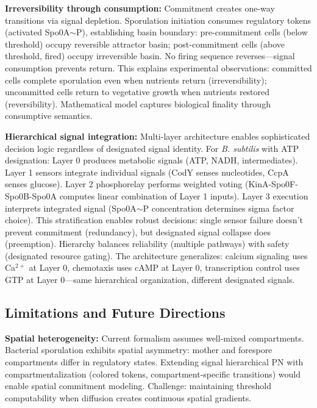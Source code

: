 \documentclass[10pt,letterpaper]{article}
\begin{document}
\textbf{Irreversibility through consumption:} Commitment creates one-way transitions via signal depletion. Sporulation initiation consumes regulatory tokens (activated Spo0A$\sim$P), establishing basin boundary: pre-commitment cells (below threshold) occupy reversible attractor basin; post-commitment cells (above threshold, fired) occupy irreversible basin. No firing sequence reverses---signal consumption prevents return. This explains experimental observations: committed cells complete sporulation even when nutrients return (irreversibility); uncommitted cells return to vegetative growth when nutrients restored (reversibility). Mathematical model captures biological finality through consumptive semantics.

\textbf{Hierarchical signal integration:} Multi-layer architecture enables sophisticated decision logic regardless of designated signal identity. For \textit{B. subtilis} with ATP designation: Layer 0 produces metabolic signals (ATP, NADH, intermediates). Layer 1 sensors integrate individual signals (CodY senses nucleotides, CcpA senses glucose). Layer 2 phosphorelay performs weighted voting (KinA-Spo0F-Spo0B-Spo0A computes linear combination of Layer 1 inputs). Layer 3 execution interprets integrated signal (Spo0A$\sim$P concentration determines sigma factor choice). This stratification enables robust decisions: single sensor failure doesn't prevent commitment (redundancy), but designated signal collapse does (preemption). Hierarchy balances reliability (multiple pathways) with safety (designated resource gating). The architecture generalizes: calcium signaling uses Ca$^{2+}$ at Layer 0, chemotaxis uses cAMP at Layer 0, transcription control uses GTP at Layer 0---same hierarchical organization, different designated signals.

\subsection{Limitations and Future Directions}

\textbf{Spatial heterogeneity:} Current formalism assumes well-mixed compartments. Bacterial sporulation exhibits spatial asymmetry: mother and forespore compartments differ in regulatory states. Extending signal hierarchical PN with compartmentalization (colored tokens, compartment-specific transitions) would enable spatial commitment modeling. Challenge: maintaining threshold computability when diffusion creates continuous spatial gradients.
\end{document}
